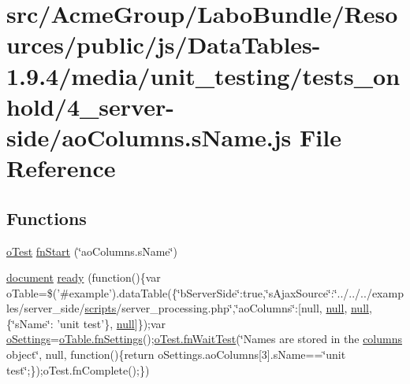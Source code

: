 \hypertarget{4__server-side_2ao_columns_8s_name_8js}{\section{src/\+Acme\+Group/\+Labo\+Bundle/\+Resources/public/js/\+Data\+Tables-\/1.9.4/media/unit\+\_\+testing/tests\+\_\+onhold/4\+\_\+server-\/side/ao\+Columns.s\+Name.\+js File Reference}
\label{4__server-side_2ao_columns_8s_name_8js}
}
\subsection*{Functions}
\begin{DoxyCompactItemize}
\item 
\hyperlink{unit__test_8js_a3b2d259e2df3b6860d9047a92d09d0d6}{o\+Test} \hyperlink{4__server-side_2ao_columns_8s_name_8js_a88a49923bad9d6c46c3d48894d862fe5}{fn\+Start} (\char`\"{}ao\+Columns.\+s\+Name\char`\"{})
\item 
\hyperlink{outside_events_8js_aa14f8e0338cced6720590fd2ea13bd4b}{document} \hyperlink{4__server-side_2ao_columns_8s_name_8js_adf1fc6d60a62308db03c52b0f46d92be}{ready} (function()\{var o\+Table=\$('\#example').data\+Table(\{\char`\"{}b\+Server\+Side\char`\"{}\+:true,\char`\"{}s\+Ajax\+Source\char`\"{}\+:\char`\"{}../../../examples/server\+\_\+side/\hyperlink{tinymce_8jquery_8dev_8js_a09066d4d580eeec222f858d588b4cdef}{scripts}/server\+\_\+processing.\+php\char`\"{},\char`\"{}ao\+Columns\char`\"{}\+:\mbox{[}null, \hyperlink{validate_8js_afb8e110345c45e74478894341ab6b28e}{null}, \hyperlink{validate_8js_afb8e110345c45e74478894341ab6b28e}{null},\{\char`\"{}s\+Name\char`\"{}\+: 'unit test'\}, \hyperlink{validate_8js_afb8e110345c45e74478894341ab6b28e}{null}\mbox{]}\});var \hyperlink{model_8settings_8js_a4857b9c813b4dea010668e9555d0aca7}{o\+Settings}=\hyperlink{api_8methods_8js_a78f387fab92a85c2cb7830bc5d8a6141}{o\+Table.\+fn\+Settings}();\hyperlink{onhold_24__server-side_2__zero__config_8js_ab25c4d596771c0133cdc45178ce72c3d}{o\+Test.\+fn\+Wait\+Test}(\char`\"{}Names are stored in the \hyperlink{model_8defaults_8columns_8js_af310571d7a4fac04bd949bdefb852a47}{columns} object\char`\"{}, null, function()\{return o\+Settings.\+ao\+Columns\mbox{[}3\mbox{]}.s\+Name==\char`\"{}unit test\char`\"{};\});o\+Test.\+fn\+Complete();\})
\end{DoxyCompactItemize}


